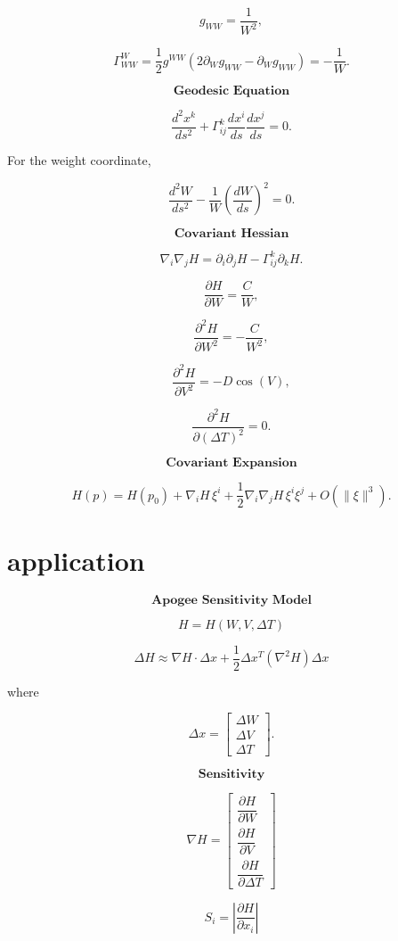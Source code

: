 \documentclass{article}
\begin{document}
\[
g_{WW}
=
\frac1{W^2},
\]

\[
\Gamma^W_{WW}
=
\frac12g^{WW}
\left(
2\partial_Wg_{WW}
-
\partial_Wg_{WW}
\right)
=
-\frac1W.
\]

\[
\textbf{Geodesic Equation}
\]

\[
\frac{d^2x^k}{ds^2}
+
\Gamma^k_{ij}
\frac{dx^i}{ds}
\frac{dx^j}{ds}
=
0.
\]

For the weight coordinate,

\[
\frac{d^2W}{ds^2}
-
\frac1W
\left(
\frac{dW}{ds}
\right)^2
=
0.
\]

\[
\textbf{Covariant Hessian}
\]

\[
\nabla_i\nabla_jH
=
\partial_i\partial_jH
-
\Gamma^k_{ij}\partial_kH.
\]

\[
\frac{\partial H}{\partial W}
=
\frac{C}{W},
\]

\[
\frac{\partial^2H}{\partial W^2}
=
-\frac{C}{W^2},
\]

\[
\frac{\partial^2H}{\partial V^2}
=
-D\cos(V),
\]

\[
\frac{\partial^2H}{\partial(\Delta T)^2}
=
0.
\]

\[
\textbf{Covariant Expansion}
\]

\[
H(p)
=
H(p_0)
+
\nabla_iH\,\xi^i
+
\frac12
\nabla_i\nabla_jH
\,\xi^i\xi^j
+
O(\|\xi\|^3).
\]

\section*{application}
\[
\textbf{Apogee Sensitivity Model}
\]

\[
H=H(W,V,\Delta T)
\]

\[
\Delta H
\approx
\nabla H\cdot\Delta x
+
\frac12
\Delta x^T
(\nabla^2H)
\Delta x
\]

where

\[
\Delta x=
\begin{bmatrix}
\Delta W\\
\Delta V\\
\Delta T
\end{bmatrix}.
\]

\[
\textbf{Sensitivity}
\]

\[
\nabla H
=
\begin{bmatrix}
\dfrac{\partial H}{\partial W}\\[6pt]
\dfrac{\partial H}{\partial V}\\[6pt]
\dfrac{\partial H}{\partial \Delta T}
\end{bmatrix}
\]

\[
S_i=
\left|
\frac{\partial H}{\partial x_i}
\right|
\]
\end{document}
